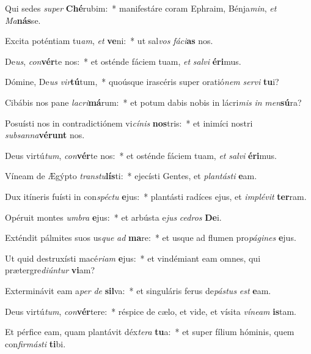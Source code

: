 \item Qui sedes \textit{su}\textit{per} \textbf{Ché}rubim:~* manifestáre coram Ephraim, Bénja\textit{min}, \textit{et} \textit{Ma}\textbf{nás}se.
\item Excita poténtiam tu\textit{am}, \textit{et} \textbf{ve}ni:~* ut sal\textit{vos} \textit{fá}\textit{ci}\textbf{as} nos.
\item De\textit{us}, \textit{con}\textbf{vér}te nos:~* et osténde fáciem tuam, \textit{et} \textit{sal}\textit{vi} \textbf{é}\textbf{ri}mus.
\item Dómine, De\textit{us} \textit{vir}\textbf{tú}tum,~* quoúsque irascéris super oratió\textit{nem} \textit{ser}\textit{vi} \textbf{tu}i?
\item Cibábis nos pane \textit{la}\textit{cri}\textbf{má}rum:~* et potum dabis nobis in lácri\textit{mis} \textit{in} \textit{men}\textbf{sú}ra?
\item Posuísti nos in contradictiónem vi\textit{cí}\textit{nis} \textbf{nos}tris:~* et inimíci nostri \textit{sub}\textit{san}\textit{na}\textbf{vé}\textbf{runt} nos.
\item Deus virtú\textit{tum}, \textit{con}\textbf{vér}te nos:~* et osténde fáciem tuam, \textit{et} \textit{sal}\textit{vi} \textbf{é}\textbf{ri}mus.
\item Víneam de Ægýpto \textit{trans}\textit{tu}\textbf{lís}ti:~* ejecísti Gentes, et \textit{plan}\textit{tás}\textit{ti} \textbf{e}am.
\item Dux itíneris fuísti in con\textit{spéc}\textit{tu} \textbf{e}jus:~* plantásti radíces ejus, et \textit{im}\textit{plé}\textit{vit} \textbf{ter}ram.
\item Opéruit montes \textit{um}\textit{bra} \textbf{e}jus:~* et arbústa e\textit{jus} \textit{ce}\textit{dros} \textbf{De}i.
\item Exténdit pálmites suos us\textit{que} \textit{ad} \textbf{ma}re:~* et usque ad flumen pro\textit{pá}\textit{gi}\textit{nes} \textbf{e}jus.
\item Ut quid destruxísti macé\textit{ri}\textit{am} \textbf{e}jus:~* et vindémiant eam omnes, qui prætergre\textit{di}\textit{ún}\textit{tur} \textbf{vi}am?
\item Exterminávit eam a\textit{per} \textit{de} \textbf{sil}va:~* et singuláris ferus de\textit{pás}\textit{tus} \textit{est} \textbf{e}am.
\item Deus virtú\textit{tum}, \textit{con}\textbf{vér}tere:~* réspice de cælo, et vide, et vísita \textit{ví}\textit{ne}\textit{am} \textbf{is}tam.
\item Et pérfice eam, quam plantávit déx\textit{te}\textit{ra} \textbf{tu}a:~* et super fílium hóminis, quem con\textit{fir}\textit{más}\textit{ti} \textbf{ti}bi.
